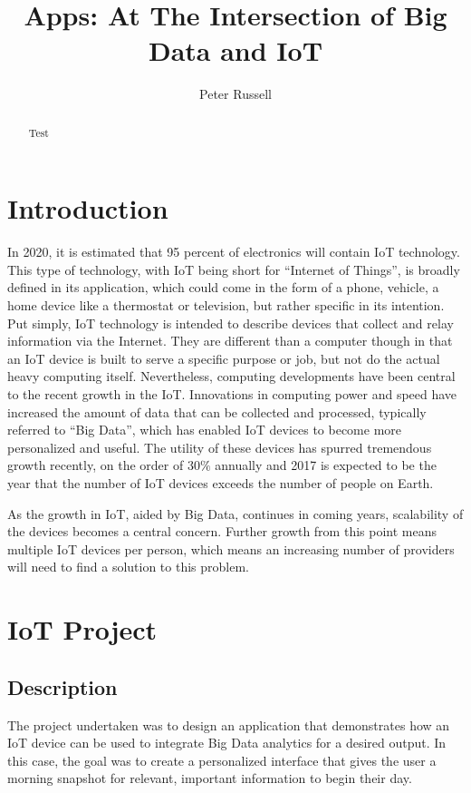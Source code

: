 \documentclass[sigconf]{acmart}
\begin{document}
\title{Apps: At The Intersection of Big Data and IoT }

\author{Peter Russell}

\begin{abstract}
Test
\end{abstract}


\maketitle


\section{Introduction}
In 2020, it is estimated that 95 percent of electronics will contain IoT technology. This type of technology, with IoT being short for ``Internet of Things'', is broadly defined in its application, which could come in the form of a phone, vehicle, a home device like a thermostat or television, but rather specific in its intention. Put simply, IoT technology is intended to describe devices that collect and relay information via the Internet. They are different than a computer though in that an IoT device is built to serve a specific purpose or job, but not do the actual heavy computing itself. Nevertheless, computing developments have been central to the recent growth in the IoT. Innovations in computing power and speed have increased the amount of data that can be collected and processed, typically referred to ``Big Data'', which has enabled IoT devices to become more personalized and useful. The utility of these devices has spurred tremendous growth recently, on the order of $30 \%$ annually and 2017 is expected to be the year that the number of IoT devices exceeds the number of people on Earth. %

As the growth in IoT, aided by Big Data, continues in coming years, scalability of the devices becomes a central concern. Further growth from this point means multiple IoT devices per person, which means an increasing number of providers will need to find a solution to this problem. 

\section{IoT Project}
\subsection{Description}
The project undertaken was to design an application that demonstrates how an IoT device can be used to integrate Big Data analytics for a desired output. In this case, the goal was to create a personalized interface that gives the user a morning snapshot for relevant, important information to begin their day. 
\end{document}
